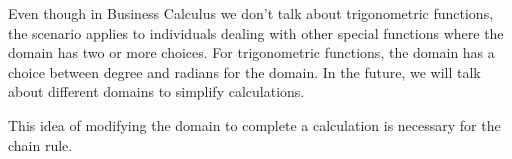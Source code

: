 \documentclass{ximera}
\begin{document}
Even though in Business Calculus we don't talk about trigonometric functions, the scenario applies to individuals dealing with other special functions where the domain has two or more choices. For trigonometric functions, the domain has a choice between degree and radians for the domain. In the future, we will talk about different domains to simplify calculations.

This idea of modifying the domain to complete a calculation is necessary for the chain rule.
\end{document}
